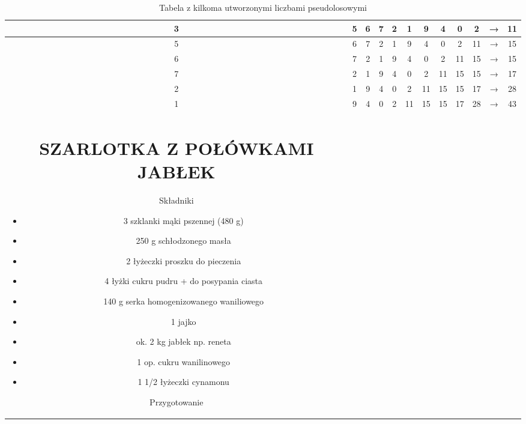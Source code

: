 \documentclass[12pt, letterpaper, titlepage]{article}
\begin{document}
\begin{table}[h]
\centering\caption{Tabela z kilkoma utworzonymi liczbami pseudolosowymi}
\begin{tabular}{c c c c c c c c c c c c}
 3 & 5 & 6 & 7 & 2 & 1 & 9 & 4 & 0 & 2 & → & 11 \\
\hline
 5 & 6 & 7 & 2 & 1 & 9 & 4 & 0 & 2 & 11 & → & 15\\
\hline
 6 & 7 & 2 & 1 & 9 & 4 & 0 & 2 & 11 & 15 & → & 15\\
\hline
7 & 2 & 1 & 9 & 4 &  0 & 2 & 11 &  15 & 15 & → & 17\\
\hline
2 & 1 & 9 & 4 & 0 &  2& 11 & 15 & 15 & 17& → & 28\\
\hline
1 &  9 & 4 & 0 & 2 & 11 & 15 & 15 & 17 & 28 & → & 43\\

\newpage

\section{SZARLOTKA Z POŁÓWKAMI JABŁEK}
\begin{flushleft}Składniki\end{flushleft}
\begin{itemize}
  \item 3 szklanki mąki pszennej (480 g)
  \item 250 g schłodzonego masła
  \item 2 łyżeczki proszku do pieczenia
  \item 4 łyżki cukru pudru + do posypania ciasta
  \item 140 g serka homogenizowanego waniliowego
  \item 1 jajko
  \item  ok. 2 kg jabłek np. reneta
  \item  1 op. cukru wanilinowego
  \item  1 1/2 łyżeczki cynamonu
\end{itemize}

\begin{flushleft}Przygotowanie\end{flushleft}


\end{tabular}
\end{table}
\end{document}

